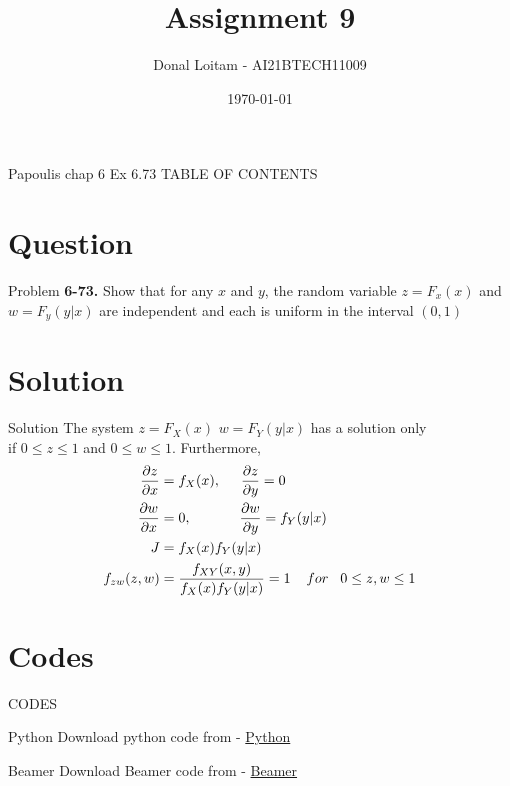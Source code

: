 \documentclass{beamer}
\title{Assignment 9}
\author{Donal Loitam - AI21BTECH11009}
\date{\today}
\begin{document}
\begin{frame}
    \titlepage 
\end{frame}

\logo{}


\begin{frame}{Papoulis chap 6 Ex 6.73}
TABLE OF CONTENTS
    \tableofcontents
\end{frame}


\section{Question}
\begin{frame}{Problem}
\textbf{6-73.} Show that for any $x$ and $y$, the random variable $z = F_x(x)$ and $w = F_y(y|x)$ are independent and each is uniform in the interval $(0,1)$
\end{frame}

\section{Solution}
\begin{frame}{Solution}
The system $z = F_X(x)$ \hspace{5mm} $w = F_Y(y|x)$ \hspace{3mm} has a solution only \\
if $0 \le z \le 1$ and $0 \le w \le 1$. Furthermore, \\
    \begin{align}
    \frac{\partial z}{\partial x} &= f_X(x), \hspace{5mm} \frac{\partial z}{\partial y} = 0\\
    \frac{\partial w}{\partial x} &= 0 , \hspace{12mm} \frac{\partial w}{\partial y} = f_Y(y|x)\\
    J &= f_X(x)f_Y(y|x) \\
    f_{zw}(z,w) &= \frac{f_{XY}(x,y)}{f_X(x)f_Y(y|x)} = 1 \hspace{4mm}  for  \hspace{3mm} 0 \le z,w \le 1
    \end{align}
\end{frame}



\section{Codes}
\begin{frame}{CODES}
    \begin{block}{Python}
         Download python code from - \href{...}{Python}
    \end{block}

 \begin{block}{Beamer}
         Download Beamer code from - \href{...}{Beamer}
    \end{block}
\end{frame} 
\end{document}
